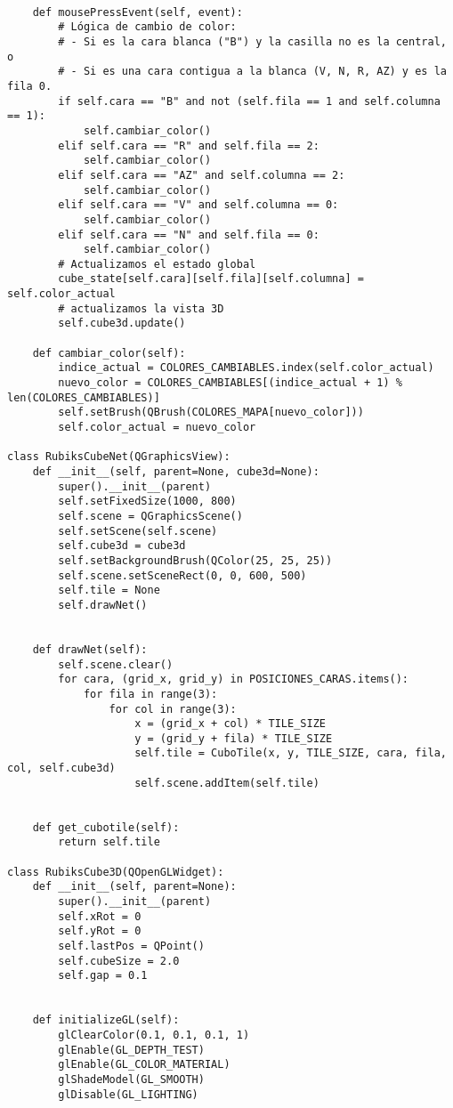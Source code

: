 \begin{lstlisting}
        
    def mousePressEvent(self, event):
        # Lógica de cambio de color:
        # - Si es la cara blanca ("B") y la casilla no es la central, o
        # - Si es una cara contigua a la blanca (V, N, R, AZ) y es la fila 0.
        if self.cara == "B" and not (self.fila == 1 and self.columna == 1):
            self.cambiar_color()
        elif self.cara == "R" and self.fila == 2:
            self.cambiar_color()
        elif self.cara == "AZ" and self.columna == 2:
            self.cambiar_color()
        elif self.cara == "V" and self.columna == 0:
            self.cambiar_color()
        elif self.cara == "N" and self.fila == 0:
            self.cambiar_color()
        # Actualizamos el estado global
        cube_state[self.cara][self.fila][self.columna] = self.color_actual  
        # actualizamos la vista 3D
        self.cube3d.update()

    def cambiar_color(self):
        indice_actual = COLORES_CAMBIABLES.index(self.color_actual)
        nuevo_color = COLORES_CAMBIABLES[(indice_actual + 1) % len(COLORES_CAMBIABLES)]
        self.setBrush(QBrush(COLORES_MAPA[nuevo_color]))
        self.color_actual = nuevo_color

class RubiksCubeNet(QGraphicsView):
    def __init__(self, parent=None, cube3d=None):
        super().__init__(parent)
        self.setFixedSize(1000, 800)
        self.scene = QGraphicsScene()
        self.setScene(self.scene)
        self.cube3d = cube3d
        self.setBackgroundBrush(QColor(25, 25, 25))
        self.scene.setSceneRect(0, 0, 600, 500)
        self.tile = None
        self.drawNet()
        

    def drawNet(self):
        self.scene.clear()
        for cara, (grid_x, grid_y) in POSICIONES_CARAS.items():
            for fila in range(3):
                for col in range(3):
                    x = (grid_x + col) * TILE_SIZE
                    y = (grid_y + fila) * TILE_SIZE
                    self.tile = CuboTile(x, y, TILE_SIZE, cara, fila, col, self.cube3d)
                    self.scene.addItem(self.tile)

    
    def get_cubotile(self):
        return self.tile

class RubiksCube3D(QOpenGLWidget):
    def __init__(self, parent=None):
        super().__init__(parent)
        self.xRot = 0
        self.yRot = 0
        self.lastPos = QPoint()
        self.cubeSize = 2.0
        self.gap = 0.1


    def initializeGL(self):
        glClearColor(0.1, 0.1, 0.1, 1)
        glEnable(GL_DEPTH_TEST)
        glEnable(GL_COLOR_MATERIAL)
        glShadeModel(GL_SMOOTH)
        glDisable(GL_LIGHTING) 


\end{lstlisting}
